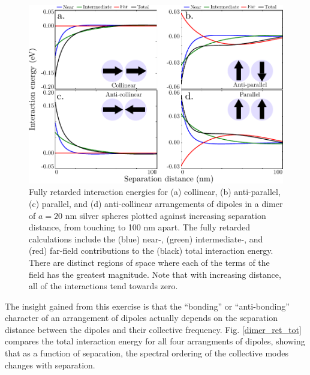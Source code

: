 \documentclass [11pt, proquest] {uwthesis}[2016/11/22]
\begin{document}
\begin{figure}
\begin{centering}
\includegraphics{dimer_ret.pdf}
\caption{Fully retarded interaction energies for (a) collinear, (b) anti-parallel, (c) parallel, and (d) anti-collinear arrangements of dipoles in a dimer of $a=20$ nm silver spheres plotted against increasing separation distance, from touching to 100 nm apart. The fully retarded calculations include the (blue) near-, (green) intermediate-, and (red) far-field contributions to the (black) total interaction energy. There are distinct regions of space where each of the terms of the field has the greatest magnitude. Note that with increasing distance, all of the interactions tend towards zero.}
\label{dimer_ret}
\end{centering}
\end{figure}

The insight gained from this exercise is that the ``bonding'' or ``anti-bonding'' character of an arrangement of dipoles actually depends on the separation distance between the dipoles and their collective frequency. Fig. \ref{dimer_ret_tot} compares the total interaction energy for all four arrangments of dipoles, showing that as a function of separation, the spectral ordering of the collective modes changes with separation.
\end{document}
